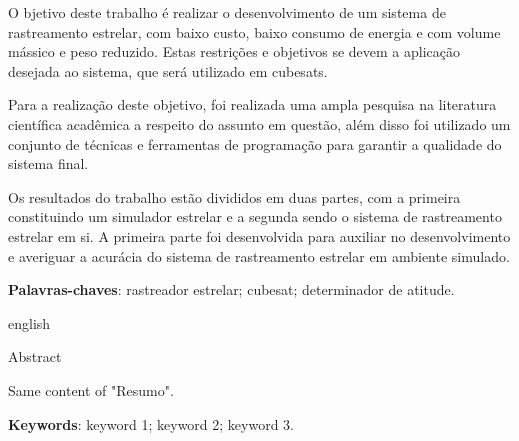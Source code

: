 \begin{resumo}
    
    O bjetivo deste trabalho é realizar o desenvolvimento de um sistema de rastreamento estrelar, com baixo custo, baixo consumo de energia e com volume mássico e peso reduzido.
    Estas restrições e objetivos  se devem a aplicação desejada ao sistema, que será utilizado em cubesats.

    Para a realização deste objetivo, foi realizada uma ampla pesquisa na literatura científica acadêmica a respeito do assunto em questão, além disso foi utilizado um conjunto de técnicas e ferramentas de programação para garantir a qualidade do sistema final.
    
    Os resultados do trabalho estão divididos em duas partes, com a primeira constituindo um simulador estrelar e a segunda sendo o sistema de rastreamento estrelar em si. A primeira parte foi desenvolvida para auxiliar no desenvolvimento e averiguar a acurácia do sistema de rastreamento estrelar em ambiente simulado.
    
    \vspace{\onelineskip}

    \noindent\textbf{Palavras-chaves}: rastreador estrelar; cubesat; determinador de atitude.

    \vspace{\onelineskip}
    \vspace{\onelineskip}

    \begin{otherlanguage*}{english}
    \begin{center}{\ABNTEXchapterfont\huge Abstract}\end{center}

Same content of "Resumo".       

    \vspace{\onelineskip}

    \noindent\textbf{Keywords}: keyword 1; keyword 2; keyword 3. 

    \end{otherlanguage*}
\end{resumo}



%
%
%
\listoffigures*
\cleardoublepage
%
\listoftables*
\cleardoublepage
%

